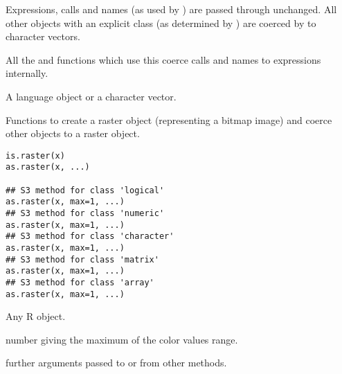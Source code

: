 %
\begin{Details}\relax
Expressions, calls and names (as used by ) are passed
through unchanged.  All other objects with an explicit class (as
determined by ) are coerced by
 to character vectors.

All the  and  functions which use this coerce
calls and names to expressions internally.
\end{Details}
%
\begin{Value}
A language object or a character vector.
\end{Value}
%
\begin{Description}\relax
Functions to create a raster object (representing a bitmap
image) and coerce other objects to a raster object.
\end{Description}
%
\begin{Usage}
\begin{verbatim}
is.raster(x)
as.raster(x, ...)

## S3 method for class 'logical'
as.raster(x, max=1, ...)
## S3 method for class 'numeric'
as.raster(x, max=1, ...)
## S3 method for class 'character'
as.raster(x, max=1, ...)
## S3 method for class 'matrix'
as.raster(x, max=1, ...)
## S3 method for class 'array'
as.raster(x, max=1, ...)
\end{verbatim}
\end{Usage}
%
\begin{Arguments}
\begin{ldescription}
\item[\code{x}] 
Any R object.

\item[\code{max}] number giving the maximum of the color values range.
\item[\code{...}] further arguments passed to or from other methods.
\end{ldescription}
\end{Arguments}
%
